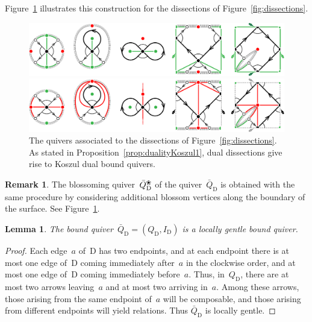 \documentclass{amsart}
\newtheorem{lemma}[theorem]{Lemma}
\theoremstyle{definition}
\newtheorem{remark}[theorem]{Remark}
\newcommand{\fref}[1]{Figure~\ref{#1}} %
\newcommand{\blossom}{^\text{\ding{96}}} %
\newcommand{\dissection}{\mathrm{D}} %
\begin{document}
\fref{fig:quiversDissections} illustrates this construction for the dissections of \fref{fig:dissections}.

\begin{figure}[t]
	\capstart
	\centerline{\includegraphics[scale=.7]{quiversDissections1}}
	\medskip
	\centerline{\includegraphics[scale=.7]{quiversDissections2}}
	\caption{The quivers associated to the dissections of \fref{fig:dissections}. As stated in Proposition~\ref{prop:dualityKoszul1}, dual dissections give rise to Koszul dual bound quivers.}
	\label{fig:quiversDissections}
\end{figure}

\begin{remark}
The blossoming quiver~$\bar Q_\dissection\blossom$ of the quiver~$\bar Q_\dissection$ is obtained with the same procedure by considering additional blossom vertices along the boundary of the surface. See \fref{fig:quiversDissections}.
\end{remark}

\begin{lemma}
\label{lemm:quiverOfDissectionIsLocallyGentle}
The bound quiver~$\bar Q_{\dissection} = (Q_{\dissection}, I_{\dissection})$ is a locally gentle bound quiver.
\end{lemma}

\begin{proof}
Each edge~$a$ of~$\dissection$ has two endpoints, and at each endpoint there is at most one edge of~$\dissection$ coming immediately after~$a$ in the clockwise order, and at most one edge of~$\dissection$ coming immediately before~$a$.
Thus, in~$Q_{\dissection}$, there are at most two arrows leaving~$a$ and at most two arriving in~$a$.
Among these arrows, those arising from the same endpoint of~$a$ will be composable, and those arising from different endpoints will yield relations.
Thus $\bar Q_{\dissection}$ is locally gentle.
\end{proof}
\end{document}
